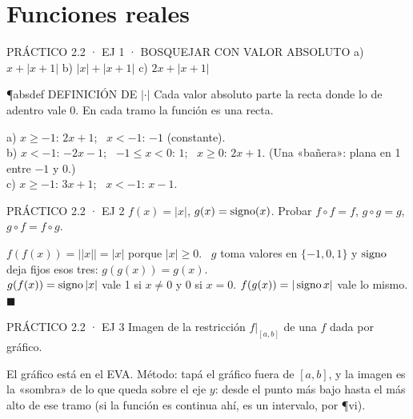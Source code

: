 \section{Funciones reales}

\begin{enunciado}{PRÁCTICO 2.2 · EJ 1 · BOSQUEJAR CON VALOR ABSOLUTO}
a) $x+|x+1|$ \quad b) $|x|+|x+1|$ \quad c) $2x+|x+1|$
\end{enunciado}
\begin{uso}{\P{absdef} DEFINICIÓN DE $|\cdot|$}
Cada valor absoluto parte la recta donde lo de adentro vale 0. En cada tramo la función es una recta.
\end{uso}
a) $x\ge-1$: $2x+1$; \ $x<-1$: $-1$ (constante).\\
b) $x<-1$: $-2x-1$; \ $-1\le x<0$: $1$; \ $x\ge0$: $2x+1$. (Una «bañera»: plana en 1 entre $-1$ y $0$.)\\
c) $x\ge-1$: $3x+1$; \ $x<-1$: $x-1$.
\begin{center}
\end{center}

\begin{enunciado}{PRÁCTICO 2.2 · EJ 2}
$f(x)=|x|$, $g(x)=\operatorname{signo}(x)$. Probar $f\circ f=f$, $g\circ g=g$, $g\circ f=f\circ g$.
\end{enunciado}
$f(f(x))=\big||x|\big|=|x|$ porque $|x|\ge0$. \ $g$ toma valores en $\{-1,0,1\}$ y $\operatorname{signo}$ deja fijos esos tres: $g(g(x))=g(x)$.\\
$g(f(x))=\operatorname{signo}|x|$ vale 1 si $x\neq0$ y 0 si $x=0$. $f(g(x))=|\operatorname{signo} x|$ vale lo mismo. $\blacksquare$

\begin{enunciado}{PRÁCTICO 2.2 · EJ 3}
Imagen de la restricción $f|_{[a,b]}$ de una $f$ dada por gráfico.
\end{enunciado}
\begin{falta}
El gráfico está en el EVA. Método: tapá el gráfico fuera de $[a,b]$, y la imagen es la «sombra» de lo que queda sobre el eje $y$: desde el punto más bajo hasta el más alto de ese tramo (si la función es continua ahí, es un intervalo, por \P{vi}).
\end{falta}

